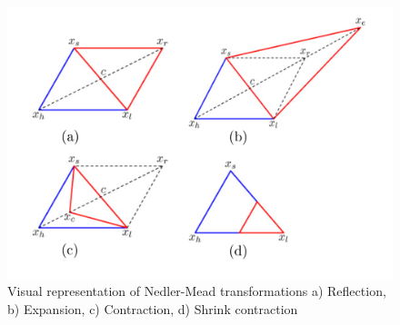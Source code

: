 \begin{figure}
\centering
\includegraphics[width=\linewidth]{figures/MAP_expl.png}
\caption[Visual representation of Nedler-Mead transformations \citep{sachin:2016}]{Visual representation of Nedler-Mead transformations a) Reflection, b) Expansion, c) Contraction, d) Shrink contraction \citep{sachin:2016}}
\label{neldermeadfig}
\end{figure}


%	
%	
%	
%	
%
